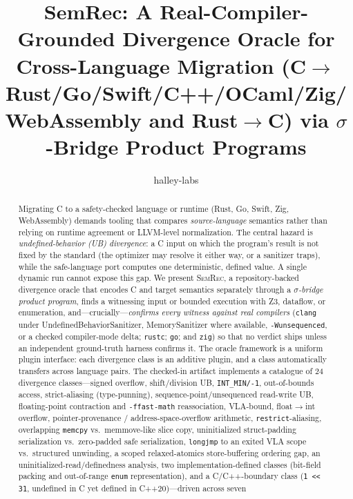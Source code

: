 \documentclass[10pt,a4paper]{article}
\title{\textbf{SemRec: A Real-Compiler-Grounded Divergence Oracle for\\Cross-Language Migration (C$\to$Rust/Go/Swift/C++/OCaml/Zig/WebAssembly and Rust$\to$C) via $\sigma$-Bridge Product Programs}}
\date{}
\author{halley-labs}
\begin{document}
\maketitle

\begin{abstract}
Migrating C to a safety-checked language or runtime (Rust, Go, Swift, Zig,
WebAssembly) demands tooling that
compares \emph{source-language} semantics rather than relying on runtime
agreement or LLVM-level normalization. The central hazard is
\emph{undefined-behavior (UB) divergence}: a C input on which the program's
result is not fixed by the standard (the optimizer may resolve it either way, or
a sanitizer traps), while the safe-language port computes one deterministic,
defined value. A single dynamic run cannot expose this gap. We present
\textsc{SemRec}, a repository-backed divergence oracle that encodes C and target
semantics separately through a \emph{$\sigma$-bridge product program}, finds a
witnessing input or bounded execution with Z3, dataflow, or enumeration,
and---crucially---\emph{confirms every witness
against real compilers} (\texttt{clang} under UndefinedBehaviorSanitizer,
MemorySanitizer where available, \texttt{-Wunsequenced}, or a checked
compiler-mode delta; \texttt{rustc}; \texttt{go}; and \texttt{zig}) so that no verdict ships
unless an independent ground-truth harness confirms it. The oracle framework is a uniform plugin
interface: each divergence class is an additive plugin, and a class
automatically transfers across language pairs. The checked-in artifact
implements a catalogue of 24 divergence classes---signed overflow,
shift/division UB, \texttt{INT\_MIN/-1}, out-of-bounds access, strict-aliasing
(type-punning), sequence-point/unsequenced read-write UB, floating-point contraction and \texttt{-ffast-math}
reassociation, VLA-bound, float$\to$int overflow, pointer-provenance /
address-space-overflow arithmetic, \texttt{restrict}-aliasing, overlapping
\texttt{memcpy} vs.\ memmove-like slice copy, uninitialized struct-padding
serialization vs.\ zero-padded safe serialization, \texttt{longjmp} to an exited
VLA scope vs.\ structured unwinding, a scoped relaxed-atomics
store-buffering ordering gap, an
uninitialized-read/definedness analysis, two implementation-defined classes
(bit-field packing and out-of-range \texttt{enum} representation), and a
C/C++-boundary class
(\texttt{1 << 31}, undefined in C yet defined in C++20)---driven across seven

\end{abstract}
\end{document}
